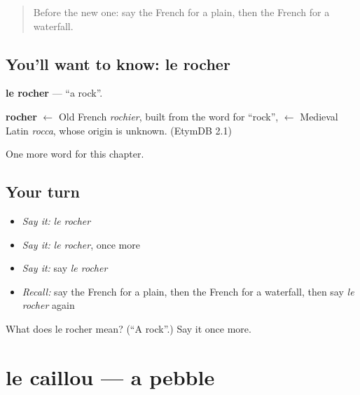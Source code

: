 \label{lesson:FR-C171-rocher}



\begin{quote}
Before the new one: say the French for a plain, then the French for a waterfall.
\end{quote}

\subsection*{You'll want to know: le rocher}
\textbf{le rocher} — \textquotedblleft{}a rock\textquotedblright{}.

\begin{cousinweb}
\textbf{rocher} $\leftarrow$ Old French \emph{rochier}, built from the word for \textquotedblleft{}rock\textquotedblright{}, $\leftarrow$ Medieval Latin \emph{rocca}, whose origin is unknown. (EtymDB 2.1)
\end{cousinweb}

\begin{grammarlens}[title={What you've built}]
One more word for this chapter.
\end{grammarlens}

\subsection*{Your turn}
\begin{itemize}
\raggedright
  \item \emph{Say it:} \emph{le rocher}
  \item \emph{Say it:} \emph{le rocher}, once more
  \item \emph{Say it:} say \emph{le rocher}
  \item \emph{Recall:} say the French for a plain, then the French for a waterfall, then say \emph{le rocher} again
\end{itemize}

\begin{tcolorbox}[breakable,colback=teal!4,colframe=teal!35!black,title={Before you move on}]
What does le rocher mean? (\textquotedblleft{}A rock\textquotedblright{}.) Say it once more.
\end{tcolorbox}
\section[le caillou]{le caillou — a pebble}

\label{lesson:FR-C171-caillou}



